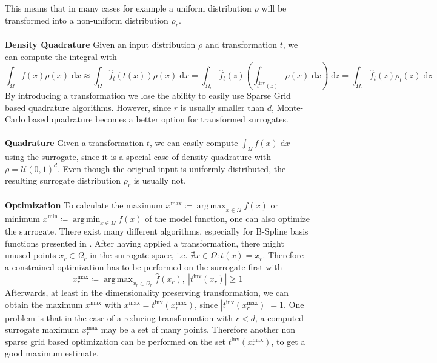 \documentclass[
  a4paper,  %
  twoside,  %
  bibliography=totoc,
  headsepline,
  cleardoublepage=empty,
  parskip=half,
  draft=false
]{scrbook}
\DeclareMathOperator*{\argmin}{arg\,min}
\DeclareMathOperator*{\argmax}{arg\,max}
\begin{document}
This means that in many cases for example a uniform distribution $\rho$ will be transformed into a non-uniform distribution $\rho_r$.
\\
\\
\textbf{Density Quadrature}
Given an input distribution $\rho$ and transformation $t$, we can compute the integral with
\begin{equation}
\int_{\Omega} f(x) \rho(x) \; \text{d}x \approx \int_{\Omega} \hat{f}_t(t(x)) \rho(x) \; \text{d}x
=
\int_{\Omega_r} \hat{f}_t(z) \left(\int_{t^{\text{inv}}(z)} \rho(x)  \; \text{d}x \right)  \; \text{d}z=
\int_{\Omega_r} \hat{f}_t(z) \rho_t(z) \; \text{d}z
\end{equation}
By introducing a transformation we lose the ability to easily use Sparse Grid based quadrature algorithms.
However, since $r$ is usually smaller than $d$, Monte-Carlo based quadrature becomes a better option for transformed surrogates.
\\
\\
\textbf{Quadrature}
Given a transformation $t$, we can easily compute $\int_{\Omega} f(x) \; \text{d}x$ using the surrogate, since it is a special case of density quadrature with $\rho=\mathcal{U}(0,1)^d$.
Even though the original input is uniformly distributed, the resulting surrogate distribution $\rho_r$ is usually not.
\\
\\
\textbf{Optimization}
To calculate the maximum $x^\text{max} \coloneqq \argmax_{x \in \Omega} f(x)$ or minimum $x^\text{min} \coloneqq \argmin_{x \in \Omega} f(x)$ of the model function, one can also optimize the surrogate. There exist many different algorithms, especially for B-Spline basis functions presented in \cite{}.
After having applied a transformation, there might unused points $x_r \in \Omega_r$ in the surrogate space, i.e. $\nexists x \in \Omega \colon t(x)=x_r$.
Therefore a constrained optimization has to be performed on the surrogate first with
\begin{equation}
x_{r}^\text{max} \coloneqq \argmax_{x_r \in \Omega_r} \hat{f}(x_r), ~ |t^{\text{inv}}(x_{r})|\geq 1
\end{equation}
Afterwards, at least in the dimensionality preserving transformation, we can obtain the maximum $x^\text{max}$ with $x^\text{max}=t^{\text{inv}}(x_{r}^\text{max})$, since $|t^{\text{inv}}(x_{r}^\text{max})|=1$.
One problem is that in the case of a reducing transformation with $r<d$, a computed surrogate maximum $x_{r}^\text{max}$ may be a set of many points.
Therefore another non sparse grid based optimization can be performed on the set $t^{\text{inv}}(x_{r}^\text{max})$, to get a good maximum estimate.
\end{document}
